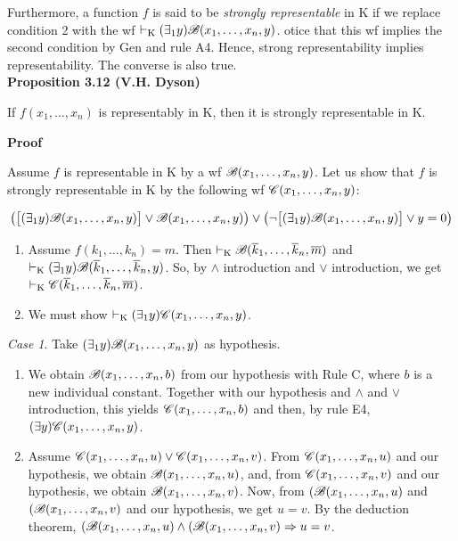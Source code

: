 Furthermore, a function $f$ is said to be \textit{strongly representable} in K if we replace condition 2 with the wf $\vdash_\text{K} (\exists_1 y) \mathscr{B}(x_1, \dots, x_n, y)$. otice that this wf implies the second condition by Gen and rule A4. Hence, strong representability implies representability. The converse is also true.\\

\textbf{Proposition 3.12 (V.H. Dyson)}

If $f(x_1, \dots, x_n)$ is representably in K, then it is strongly representable in K.

\textbf{Proof}

Assume $f$ is representable in K by a wf $\mathscr{B}(x_1, \dots, x_n, y)$. Let us show that $f$ is strongly representable in K by the following wf $\mathscr{C}(x_1, \dots, x_n, y)$:

\[
\big ( \big [ (\exists_1 y) \mathscr{B}(x_1, \dots, x_n, y) \big ] \lor \mathscr{B}(x_1, \dots, x_n, y) \big ) \lor \big ( \lnot \big [ (\exists_1 y) \mathscr{B}(x_1, \dots, x_n, y) \big ] \lor y = 0 \big )
\]

\begin{enumerate}
    \item Assume $f(k_1, \dots, k_n) = m$. Then $\vdash_\text{K} \mathscr{B}(\overline{k}_1, \dots, \overline{k}_n, \overline{m})$ and $\vdash_\text{K} (\exists_1 y) \mathscr{B}(\overline{k}_1, \dots, \overline{k}_n, y)$. So, by $\land$ introduction and $\lor$ introduction, we get $\vdash_\text{K} \mathscr{C}(\overline{k}_1, \dots, \overline{k}_n, \overline{m})$.
\end{enumerate}
\begin{enumerate} [label = \arabic*'.]
    \setcounter{enumi}{1}
    \item We must show $\vdash_\text{K} (\exists_1 y) \mathscr{C}(x_1, \dots, x_n, y)$.
\end{enumerate}

\textit{Case 1}. Take $(\exists_1 y) \mathscr{B}(x_1, \dots, x_n, y)$ as hypothesis.

\begin{enumerate} [label = (\roman*)]
    \item We obtain $\mathscr{B}(x_1, \dots, x_n, b)$ from our hypothesis with Rule C, where $b$ is a new individual constant. Together with our hypothesis and $\land$ and $\lor$ introduction, this yields $\mathscr{C}(x_1, \dots, x_n, b)$ and then, by rule E4, $(\exists y) \mathscr{C}(x_1, \dots, x_n, y)$.
    \item Assume $\mathscr{C}(x_1, \dots, x_n, u) \lor \mathscr{C}(x_1, \dots, x_n, v)$. From $\mathscr{C}(x_1, \dots, x_n, u)$ and our hypothesis, we obtain $\mathscr{B}(x_1, \dots, x_n, u)$, and, from $\mathscr{C}(x_1, \dots, x_n, v)$ and our hypothesis, we obtain $\mathscr{B}(x_1, \dots, x_n, v)$. Now, from $(\mathscr{B}(x_1, \dots, x_n, u)$ and $(\mathscr{B}(x_1, \dots, x_n, v)$ and our hypothesis, we get $u=v$. By the deduction theorem, $(\mathscr{B}(x_1, \dots, x_n, u) \land (\mathscr{B}(x_1, \dots, x_n, v) \Rightarrow u=v$.
\end{enumerate}

